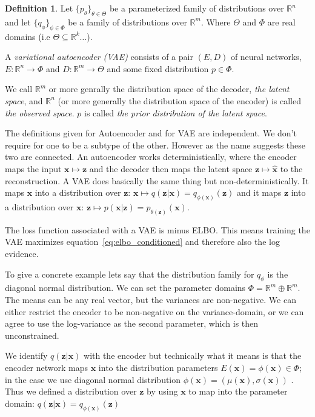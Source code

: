 \documentclass[11pt, a4paper]{report}
\theoremstyle{plain}
\theoremstyle{definition}
\newtheorem{mydef}{Definition}[chapter]
\theoremstyle{remark}
\newcommand{\R}{\mathbb{R}}
\newcommand{\x}{\mathbf{x}}
\newcommand{\z}{\mathbf{z}}
\begin{document}
\begin{mydef}
\label{def:vae}
Let $\{p_{\theta}\}_{\theta \in \Theta}$ be a parameterized 
family of distributions over $\R^n$ and let
$\{q_{\phi}\}_{\phi \in \Phi}$ be a family of distributions over $\R^m$.
Where $\Theta$ and $\Phi$ are real domains (i.e $\Theta \subseteq \R^k \dots$).

A \emph{variational autoencoder (VAE)} consists of a pair $(E,D)$ of neural networks,
$E : \R^n \to \Phi$ and $D : \R^m \to \Theta$ and some fixed distribution $p \in
\Phi$.

We call $\R^m$ or more genrally the distribution space of the decoder, \emph{the latent
space}, and $\R^n$ (or more generally the distribution space of the encoder) is called
\emph{the observed space}.
$p$ is called \emph{the prior distribution of the latent space}.
\end{mydef}

The definitions given for Autoencoder and for VAE are independent.
We don't require for one to be a subtype of the other. However as the name
suggests these two are connected.
An autoencoder works deterministically, where 
the encoder maps the input $\x \mapsto \z$ and the decoder then maps the
latent space $\z \mapsto \hat{\x}$ to the reconstruction. A VAE does
basically the same thing but non-deterministically.
It maps $\x$ into a distribution over $\z$: $\x \mapsto q(\z|\x) =
q_{\phi(\x)}(\z)$ and it maps
$\z$ into a distribution over $\x$: $\z \mapsto p(\x|\z) = p_{\theta(\z)}(\x)$.

The loss function associated with a VAE is minus ELBO. This means training
the VAE maximizes equation~\ref{eq:elbo_conditioned} and therefore also
the log evidence.

To give a concrete example lets say that the distribution family for $q_{\phi}$ 
is the diagonal normal distribution.
We can set the parameter domains $\Phi = \R^m \oplus \R^m$. The means can be any
real vector, but the variances are non-negative. We can either restrict the
encoder to be non-negative on the variance-domain, or we can agree to use the
log-variance as the second parameter, which is then unconstrained.

We identify $q(\z | \x)$ with the encoder but technically what it means is that 
the encoder network maps $\x$ into the distribution parameters $E(\x) = \phi(\x)
\in \Phi$;
in the case we use diagonal normal distribution $\phi(\x) = (\mu(\x), \sigma(\x))$
. Thus we defined a distribution over $\z$ by using $\x$ to map into
the parameter domain: $q(\z | \x) = q_{\phi(\x)}(\z)$
\end{document}
